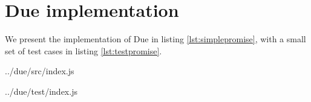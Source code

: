 \vfill\eject
\appendix

\section{Due implementation} \label{section:dueimpl}

We present the implementation of Due in listing \ref{lst:simplepromise}, with a small set of test cases in listing \ref{lst:testpromise}.

             {../due/src/index.js}


             {../due/test/index.js}






